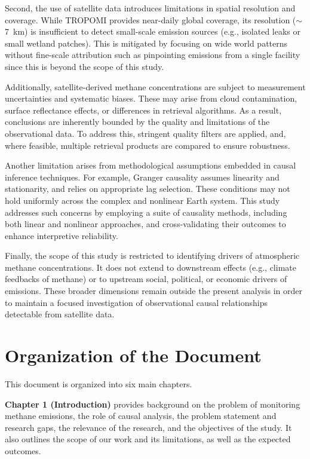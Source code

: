 Second, the use of satellite data introduces limitations in spatial resolution and coverage. While TROPOMI provides near-daily global coverage, its resolution ($\sim$7~km) is insufficient to detect small-scale emission sources (e.g., isolated leaks or small wetland patches). This is mitigated by focusing on wide world patterns without fine-scale attribution such as pinpointing emissions from a single facility since this is beyond the scope of this study.

Additionally, satellite-derived methane concentrations are subject to measurement uncertainties and systematic biases. These may arise from cloud contamination, surface reflectance effects, or differences in retrieval algorithms. As a result, conclusions are inherently bounded by the quality and limitations of the observational data. To address this, stringent quality filters are applied, and, where feasible, multiple retrieval products are compared to ensure robustness.

Another limitation arises from methodological assumptions embedded in causal inference techniques. For example, Granger causality assumes linearity and stationarity, and relies on appropriate lag selection. These conditions may not hold uniformly across the complex and nonlinear Earth system. This study addresses such concerns by employing a suite of causality methods, including both linear and nonlinear approaches, and cross-validating their outcomes to enhance interpretive reliability.

Finally, the scope of this study is restricted to identifying drivers of atmospheric methane concentrations. It does not extend to downstream effects (e.g., climate feedbacks of methane) or to upstream social, political, or economic drivers of emissions. These broader dimensions remain outside the present analysis in order to maintain a focused investigation of observational causal relationships detectable from satellite data.



\section{Organization of the Document}
This document is organized into six main chapters.

\textbf{Chapter 1 (Introduction)} provides background on the problem of monitoring methane emissions, the role of causal analysis, the problem statement and research gaps, the relevance of the research, and the objectives of the study. It also outlines the scope of our work and its limitations, as well as the expected outcomes.

